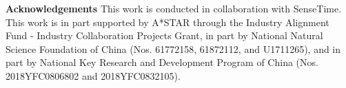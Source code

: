 \documentclass[final]{cvpr}
\begin{document}
\noindent \textbf{Acknowledgements}
This work is conducted in collaboration with SenseTime. This work is in part supported by A*STAR through the Industry Alignment Fund - Industry Collaboration Projects Grant, in part by National Natural Science Foundation of China (Nos. 61772158, 61872112, and U1711265), and in part by National Key Research and Development Program of China (Nos. 2018YFC0806802 and 2018YFC0832105).

{\small


}
\end{document}
